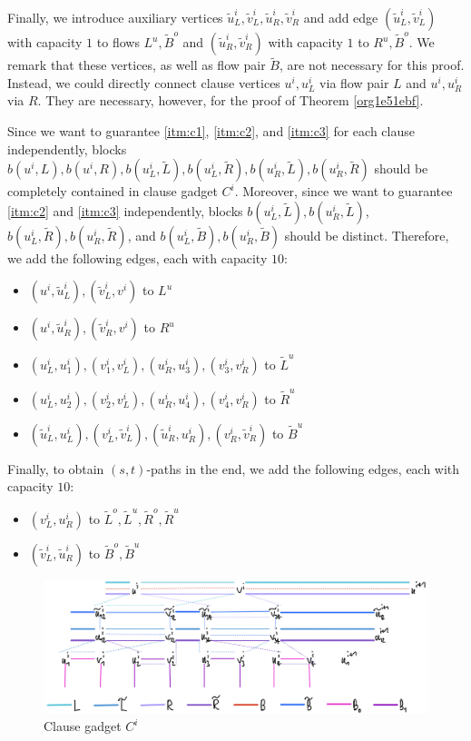 \documentclass[fontsize=11pt,paper=a4]{book}
\begin{document}
Finally, we introduce auxiliary vertices \(\tilde{u}_L^i,\tilde{v}_L^i,\tilde{u}_R^i,\tilde{v}_R^i\) and add edge \((\tilde{u}_L^i,\tilde{v}_L^i)\) with capacity \(1\) to flows \(L^u,\tilde{B}^o\) and \((\tilde{u}_R^i,\tilde{v}_R^i)\) with capacity \(1\) to \(R^u,\tilde{B}^o\).
We remark that these vertices, as well as flow pair \(\tilde{B}\), are not necessary for this proof.
Instead, we could directly connect clause vertices \(u^i,u_L^i\) via flow pair \(L\) and \(u^i,u_R^i\) via \(R\).
They are necessary, however, for the proof of Theorem \ref{org1e51ebf}.

Since we want to guarantee \ref{itm:c1}, \ref{itm:c2}, and \ref{itm:c3} for each clause independently, blocks \(b(u^i,L),b(u^i,R),b(u_L^i,\tilde{L}),b(u_L^i,\tilde{R}),b(u_R^i,\tilde{L}),b(u_R^i,\tilde{R})\) should be completely contained in clause gadget \(C^i\).
Moreover, since we want to guarantee \ref{itm:c2} and \ref{itm:c3} independently, blocks \(b(u_L^i,\tilde{L}),b(u_R^i,\tilde{L})\), \(b(u_L^i,\tilde{R}),b(u_R^i,\tilde{R})\), and \(b(u_L^i,\tilde{B}),b(u_R^i,\tilde{B})\) should be distinct.
Therefore, we add the following edges, each with capacity \(10\):

\begin{itemize}
\item \((u^i,\tilde{u}_L^i),(\tilde{v}_L^i,v^i)\) to \(L^u\)
\item \((u^i,\tilde{u}_R^i),(\tilde{v}_R^i,v^i)\) to \(R^u\)
\item \((u_L^i,u_1^i),(v_1^i,v_L^i),(u_R^i,u_3^i),(v_3^i,v_R^i)\) to \(\tilde{L}^u\)
\item \((u_L^i,u_2^i),(v_2^i,v_L^i),(u_R^i,u_4^i),(v_4^i,v_R^i)\) to \(\tilde{R}^u\)
\item \((\tilde{u}_L^i,u_L^i),(v_L^i,\tilde{v}_L^i),(\tilde{u}_R^i,u_R^i),(v_R^i,\tilde{v}_R^i)\) to \(\tilde{B}^u\)
\end{itemize}


Finally, to obtain \((s,t)\)-paths in the end, we add the following edges, each with capacity \(10\):

\begin{itemize}
\item \((v_L^i,u_R^i)\) to \(\tilde{L}^o,\tilde{L}^u,\tilde{R}^o,\tilde{R}^u\)
\item \((\tilde{v}_L^i,\tilde{u}_R^i)\) to \(\tilde{B}^o,\tilde{B}^u\)
\end{itemize}

\begin{figure}[htbp]
\centering
\includegraphics[width=.9\linewidth]{../assets/Screen Shot 2023-02-14 at 15.07.03.png}
\caption{\label{fig:org1553c0b}Clause gadget \(C^i\)}
\end{figure}
\end{document}
